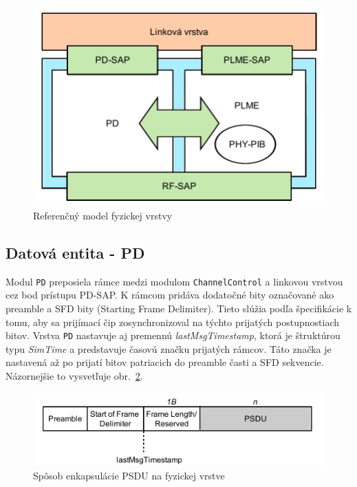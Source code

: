\begin{figure}[htbp]
\begin{center}
\includegraphics[width=120mm]{figures/topology_phy}
\caption{Referenčný model fyzickej vrstvy}
\label{fig:topology_phy}
\end{center}
\end{figure}

\subsection{Datová entita - PD}
\indent\indent Modul \texttt{PD} preposiela rámce medzi modulom \texttt{ChannelControl} a linkovou vrstvou cez bod prístupu PD-SAP. K rámcom pridáva dodatočné bity označované ako preamble a SFD bity (Starting Frame Delimiter). Tieto slúžia podľa špecifikácie k tomu, aby sa prijímací čip zosynchronizoval na týchto prijatých postupnostiach bitov. Vrstva \texttt{PD} nastavuje aj premennú \textit{lastMsgTimestamp}, ktorá je štruktúrou typu \textit{SimTime} a predstavuje časovú značku prijatých rámcov. Táto značka je nastavená až po prijatí bitov patriacich do preamble časti a SFD sekvencie. Názornejšie to vysvetľuje obr.~\ref{fig:frame_phy}.

\begin{figure}[htbp]
\begin{center}
\includegraphics[width=140mm]{figures/frame_phy}
\caption{Spôsob enkapsulácie PSDU na fyzickej vrstve}
\label{fig:frame_phy}
\end{center}
\end{figure}

